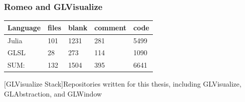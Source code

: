 \subsubsection{Romeo and GLVisualize}

\begin{table}[htbp]
    \centering
    \begin{tabular}{l|l|l|l|l}
        \hline
        \textbf{Language} & \textbf{files}    &   \textbf{blank}   &   \textbf{comment}    &  \textbf{code}\\
        \hline
        Julia  &  101   &    1231 &   281  &  5499\\
        GLSL   &   28  &   273   &    114 &  1090\\
        \hline
        SUM: & 132  &  1504  &     395    &   6641\\
        \hline
    \end{tabular}
    [GLVisualize Stack]{Repositories written for this thesis, including GLVisualize, GLAbstraction, and GLWindow}
    \label{table:romeo_loc}
\end{table}

